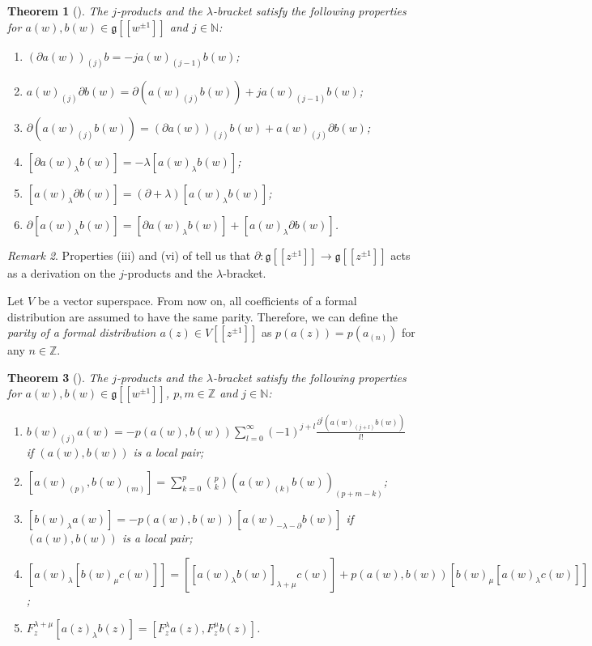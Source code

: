 \documentclass[a4paper, 12pt, reqno]{amsart}
\newtheorem{theorem}{Theorem}[section]
\theoremstyle{remark}
\newtheorem{remark}[theorem]{Remark}
\begin{document}
\begin{theorem}[{\cite[\S2.3]{nozaradan_introduction_2008}}]
  \label{thr:7}
  The $j$-products and the $\lambda$-bracket satisfy the following properties for $a(w), b(w) \in \mathfrak{g}[[w^{\pm 1}]]$ and $j \in \mathbb{N}$:
  \begin{enumerate}
  \item $(\partial a(w))_{(j)}b = -ja(w)_{(j - 1)}b(w)$;
  \item $a(w)_{(j)}\partial b(w) = \partial(a(w)_{(j)}b(w)) + ja(w)_{(j - 1)}b(w)$;
  \item $\partial(a(w)_{(j)}b(w)) = (\partial a(w))_{(j)}b(w) + a(w)_{(j)}\partial b(w)$;
  \item $[\partial a(w)_{\lambda}b(w)] = -\lambda[a(w)_{\lambda}b(w)]$;
  \item $[a(w)_{\lambda}\partial b(w)] = (\partial + \lambda)[a(w)_{\lambda}b(w)]$;
  \item $\partial[a(w)_{\lambda}b(w)] = [\partial a(w)_{\lambda}b(w)] + [a(w)_{\lambda}\partial b(w)]$.
  \end{enumerate}
\end{theorem}

\begin{remark}
  \label{rmk:5}
  Properties (iii) and (vi) of  tell us that $\partial: \mathfrak{g}[[z^{\pm 1}]] \to \mathfrak{g}[[z^{\pm 1}]]$ acts as a derivation on the $j$-products and the $\lambda$-bracket.
\end{remark}

Let $V$ be a vector superspace.
From now on, all coefficients of a formal distribution are assumed to have the same parity.
Therefore, we can define the \emph{parity of a formal distribution $a(z) \in V[[z^{\pm 1}]]$} as $p(a(z)) = p(a_{(n)})$ for any $n \in \mathbb{Z}$.

\begin{theorem}[{\cite[\S2.3]{nozaradan_introduction_2008}}]
  \label{thr:8}
  The $j$-products and the $\lambda$-bracket satisfy the following properties for $a(w), b(w) \in \mathfrak{g}[[w^{\pm 1}]]$, $p, m \in \mathbb{Z}$ and $j \in \mathbb{N}$:
  \begin{enumerate}
  \item $b(w)_{(j)}a(w) = -p(a(w), b(w))\sum_{l = 0}^{\infty}(-1)^{j + l}\frac{\partial^l(a(w)_{(j + l)}b(w))}{l!}$ if $(a(w), b(w))$ is a local pair;
  \item $[a(w)_{(p)}, b(w)_{(m)}] = \sum_{k = 0}^p\binom{p}{k}(a(w)_{(k)}b(w))_{(p + m - k)}$;
  \item $[b(w)_{\lambda}a(w)] = -p(a(w), b(w))[a(w)_{-\lambda - \partial}b(w)]$ if $(a(w), b(w))$ is a local pair;
  \item $[a(w)_{\lambda}[b(w)_{\mu}c(w)]] = [[a(w)_{\lambda}b(w)]_{\lambda + \mu}c(w)] + p(a(w), b(w))[b(w)_{\mu}[a(w)_{\lambda}c(w)]]$;
  \item $F^{\lambda + \mu}_z[a(z)_{\lambda}b(z)] = [F^{\lambda}_za(z), F^{\mu}_zb(z)]$.
  \end{enumerate}
\end{theorem}
\end{document}
